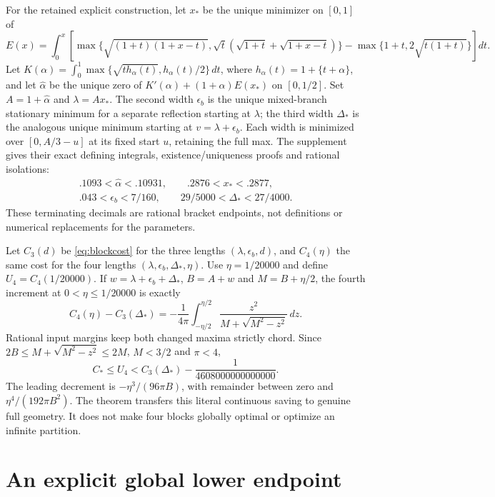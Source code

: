 \documentclass[11pt]{article}
\theoremstyle{definition}\newtheorem{definition}[theorem]{Definition}
\theoremstyle{remark}\newtheorem{remark}[theorem]{Remark}
\newcommand{\CC}{C_\ast}
\begin{document}
For the retained explicit construction, let $x_*$ be the unique minimizer
on $[0,1]$ of
\[
 E(x)=\int_0^x\!\left[
 \max\{\sqrt{(1+t)(1+x-t)},\sqrt t(\sqrt{1+t}+\sqrt{1+x-t})\}
 -\max\{1+t,2\sqrt{t(1+t)}\}\right]dt.
\]
Let $K(\alpha)=\int_0^1\max\{\sqrt{t h_\alpha(t)},h_\alpha(t)/2\}\,dt$,
where $h_\alpha(t)=1+\{t+\alpha\}$, and let $\widehat\alpha$ be the
unique zero of $K'(\alpha)+(1+\alpha)E(x_*)$ on $[0,1/2]$.
Set $A=1+\widehat\alpha$ and $\lambda=Ax_*$.
The second width $\epsilon_b$ is the unique mixed-branch stationary
minimum for a separate reflection starting at $\lambda$; the third width
$\Delta_*$ is the analogous unique minimum starting at
$v=\lambda+\epsilon_b$. Each width is minimized over
$[0,A/3-u]$ at its fixed start $u$, retaining the full max.
The supplement \cite{upperinputs} gives their exact defining integrals,
existence/uniqueness proofs and rational isolations:
\[
\begin{gathered}
 .1093<\widehat\alpha<.10931,\qquad .2876<x_*<.2877,\\
 .043<\epsilon_b<7/160,\qquad 29/5000<\Delta_*<27/4000.
\end{gathered}
\]
These terminating decimals are rational bracket endpoints, not definitions
or numerical replacements for the parameters.

Let $C_3(d)$ be \eqref{eq:blockcost} for the three lengths
$(\lambda,\epsilon_b,d)$, and $C_4(\eta)$ the same cost for the four
lengths $(\lambda,\epsilon_b,\Delta_*,\eta)$.
Use $\eta=1/20000$ and define $U_4=C_4(1/20000)$.
If $w=\lambda+\epsilon_b+\Delta_*$, $B=A+w$ and
$M=B+\eta/2$, the fourth increment at $0<\eta\le1/20000$ is exactly
\[
 C_4(\eta)-C_3(\Delta_*)=
 -\frac1{4\pi}\int_{-\eta/2}^{\eta/2}
       \frac{z^2}{M+\sqrt{M^2-z^2}}\,dz.
\]
Rational input margins keep both changed maxima strictly chord.
Since $2B\le M+\sqrt{M^2-z^2}\le2M$, $M<3/2$ and $\pi<4$,
\begin{equation}\label{eq:U4}
 \CC\le U_4<C_3(\Delta_*)-\frac1{4608000000000000}.
\end{equation}
The leading decrement is $-\eta^3/(96\pi B)$, with remainder between
zero and $\eta^4/(192\pi B^2)$. The theorem transfers this literal
continuous saving to genuine full geometry. It does not make four blocks
globally optimal or optimize an infinite partition.

\section{An explicit global lower endpoint}
\end{document}
